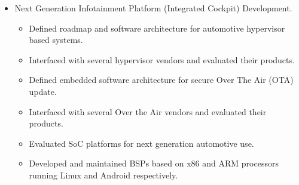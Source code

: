 \documentclass[print]{template/friggeri-cv} %
\begin{document}
\begin{entrylist}

\listentry
{\begin{itemize}
\item Next Generation Infotainment Platform (Integrated Cockpit) Development.
\begin{itemize}
\item Defined roadmap and software architecture for automotive hypervisor based systems.
\item Interfaced with several hypervisor vendors and evaluated their products.
\item Defined embedded software architecture for secure Over The Air (OTA) update.
\item Interfaced with several Over the Air vendors and evaluated their products.
\item Evaluated SoC platforms for next generation automotive use.
\item Developed and maintained BSPs based on x86 and ARM processors running Linux and Android respectively.
\end{itemize}
\end{itemize}}

\end{entrylist}
\end{document}
